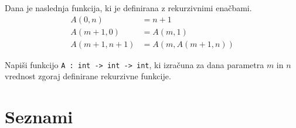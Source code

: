 \begin{ex}
Dana je naslednja funkcija, ki je definirana z rekurzivnimi ena\v cbami.
\begin{align*}
A(0, n) &= n+1 \\
A(m + 1, 0) &= A(m, 1) \\ 
A(m + 1, n + 1) &= A(m, A(m + 1, n)) 
\end{align*}

Napi\v si funkcijo \texttt{A : int -> int -> int}, ki izra\v cuna za dana parametra $m$ in $n$ vrednost zgoraj definirane rekurzivne funkcije.
\end{ex}

\section{Seznami}

